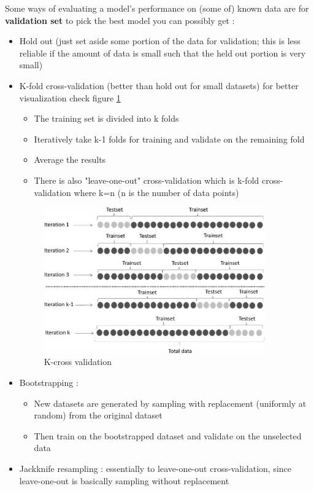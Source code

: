 Some ways of evaluating a model's performance on (some of)  known data are for \textbf{validation set } to pick  the best model you can possibly get :

\begin{itemize}
\item Hold out (just set aside some portion of the data for validation; this is less reliable if the amount of data is small such that the held out portion is very small) 
\item K-fold cross-validation (better than hold out for small datasets) for better visualization  check figure \ref{fig:cross}
\begin{itemize}
\item The training set is divided into k folds
\item Iteratively take k-1 folds for training and validate on the remaining fold
\item Average the results
\item There is also "leave-one-out" cross-validation which is k-fold cross-validation where k=n (n is the number of data points)
\end{itemize}

\begin{figure}[H]
\centering
\includegraphics[width=0.9\textwidth]{img/cross.png}
\caption{K-cross validation }
\label{fig:cross}
\end{figure}


\item Bootstrapping : 
\begin{itemize}
\item New datasets are generated by sampling with replacement (uniformly at random) from the original dataset
\item Then train on the bootstrapped dataset and validate on the unselected data
\end{itemize}
\item Jackknife resampling : 
essentially to leave-one-out cross-validation, since leave-one-out is basically sampling without replacement
\end{itemize}


